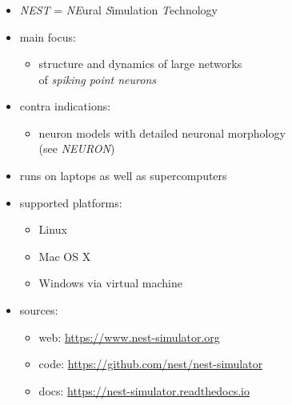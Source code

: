 \documentclass[8pt,t,usepdftitle=false]{beamer}
\begin{document}
\begin{frame}[t,plain]
  \frametitle{\ttl}
  \begin{columns}
    \begin{column}{0.7\linewidth}
      \begin{itemize}\itemsep2ex
      \item<1-> \emph{NEST} = \emph{NE}ural \emph{S}imulation \emph{T}echnology
      \item<1-> main focus:
        \begin{itemize}
        \item[] structure and dynamics of large networks\\ of \emph{spiking point neurons}
        \end{itemize}
      \item<2-> contra indications: 
        \begin{itemize}
        \item[] neuron models with detailed neuronal morphology\\
          (see \emph{NEURON})
        \end{itemize}
      \item<3-> runs on laptops as well as supercomputers {\tiny\parencite{Helias12_26,Jordan18_2}}
      \item<3-> supported platforms:
        \begin{itemize}
        \item Linux
        \item Mac OS X
        \item Windows via virtual machine
        \end{itemize}
      \item<4-> sources:
        \begin{itemize}
        \item web: \url{https://www.nest-simulator.org}
        \item code: \url{https://github.com/nest/nest-simulator}
        \item docs: \url{https://nest-simulator.readthedocs.io}
        \end{itemize}
      \end{itemize}      
    \end{column}
    \begin{column}{0.3\linewidth}
      \vspace*{20ex}
\end{column}
\end{columns}
\end{frame}
\end{document}
